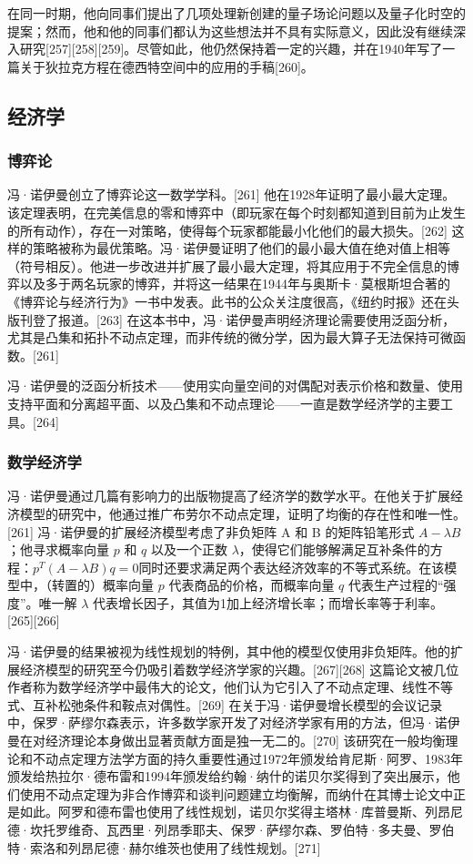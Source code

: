 在同一时期，他向同事们提出了几项处理新创建的量子场论问题以及量子化时空的提案；然而，他和他的同事们都认为这些想法并不具有实际意义，因此没有继续深入研究[257][258][259]。尽管如此，他仍然保持着一定的兴趣，并在1940年写了一篇关于狄拉克方程在德西特空间中的应用的手稿[260]。
\subsection{经济学}  
\subsubsection{博弈论}  
冯·诺伊曼创立了博弈论这一数学学科。[261] 他在1928年证明了最小最大定理。该定理表明，在完美信息的零和博弈中（即玩家在每个时刻都知道到目前为止发生的所有动作），存在一对策略，使得每个玩家都能最小化他们的最大损失。[262] 这样的策略被称为最优策略。冯·诺伊曼证明了他们的最小最大值在绝对值上相等（符号相反）。他进一步改进并扩展了最小最大定理，将其应用于不完全信息的博弈以及多于两名玩家的博弈，并将这一结果在1944年与奥斯卡·莫根斯坦合著的《博弈论与经济行为》一书中发表。此书的公众关注度很高，《纽约时报》还在头版刊登了报道。[263] 在这本书中，冯·诺伊曼声明经济理论需要使用泛函分析，尤其是凸集和拓扑不动点定理，而非传统的微分学，因为最大算子无法保持可微函数。[261]

冯·诺伊曼的泛函分析技术——使用实向量空间的对偶配对表示价格和数量、使用支持平面和分离超平面、以及凸集和不动点理论——一直是数学经济学的主要工具。[264]
\subsubsection{数学经济学}  
冯·诺伊曼通过几篇有影响力的出版物提高了经济学的数学水平。在他关于扩展经济模型的研究中，他通过推广布劳尔不动点定理，证明了均衡的存在性和唯一性。[261] 冯·诺伊曼的扩展经济模型考虑了非负矩阵 A 和 B 的矩阵铅笔形式 \(A - \lambda B\)；他寻求概率向量 \(p\) 和 \(q\) 以及一个正数 \(\lambda\)，使得它们能够解满足互补条件的方程：\(p^{T}(A - \lambda B)q = 0\)同时还要求满足两个表达经济效率的不等式系统。在该模型中，（转置的）概率向量 \(p\) 代表商品的价格，而概率向量 \(q\) 代表生产过程的“强度”。唯一解 \(\lambda\) 代表增长因子，其值为1加上经济增长率；而增长率等于利率。[265][266]

冯·诺伊曼的结果被视为线性规划的特例，其中他的模型仅使用非负矩阵。他的扩展经济模型的研究至今仍吸引着数学经济学家的兴趣。[267][268] 这篇论文被几位作者称为数学经济学中最伟大的论文，他们认为它引入了不动点定理、线性不等式、互补松弛条件和鞍点对偶性。[269] 在关于冯·诺伊曼增长模型的会议记录中，保罗·萨缪尔森表示，许多数学家开发了对经济学家有用的方法，但冯·诺伊曼在对经济理论本身做出显著贡献方面是独一无二的。[270] 该研究在一般均衡理论和不动点定理方法学方面的持久重要性通过1972年颁发给肯尼斯·阿罗、1983年颁发给热拉尔·德布雷和1994年颁发给约翰·纳什的诺贝尔奖得到了突出展示，他们使用不动点定理为非合作博弈和谈判问题建立均衡解，而纳什在其博士论文中正是如此。阿罗和德布雷也使用了线性规划，诺贝尔奖得主塔林·库普曼斯、列昂尼德·坎托罗维奇、瓦西里·列昂季耶夫、保罗·萨缪尔森、罗伯特·多夫曼、罗伯特·索洛和列昂尼德·赫尔维茨也使用了线性规划。[271]

